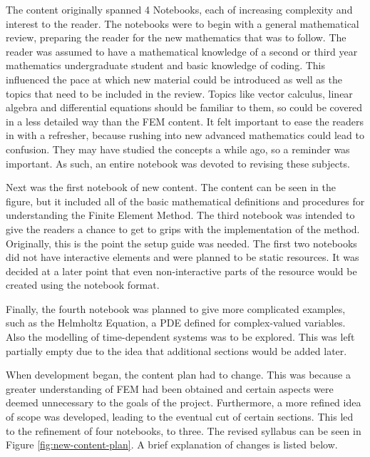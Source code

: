 The content originally spanned 4 Notebooks, each of increasing complexity and interest to the reader. The notebooks were to begin with a general mathematical review, preparing the reader for the new mathematics that was to follow. The reader was assumed to have a mathematical knowledge of a second or third year mathematics undergraduate student and basic knowledge of coding. This influenced the pace at which new material could be introduced as well as the topics that need to be included in the review. Topics like vector calculus, linear algebra and differential equations should be familiar to them, so could be covered in a less detailed way than the FEM content. It felt important to ease the readers in with a refresher, because rushing into new advanced mathematics could lead to confusion. They may have studied the concepts a while ago, so a reminder was important. As such, an entire notebook was devoted to revising these subjects.

Next was the first notebook of new content. The content can be seen in the figure, but it included all of the basic mathematical definitions and procedures for understanding the Finite Element Method. The third notebook was intended to give the readers a chance to get to grips with the implementation of the method. Originally, this is the point the setup guide was needed. The first two notebooks did not have interactive elements and were planned to be static resources. It was decided at a later point that even non-interactive parts of the resource would be created using the notebook format.

Finally, the fourth notebook was planned to give more complicated examples, such as the Helmholtz Equation, a PDE defined for complex-valued variables. Also the modelling of time-dependent systems was to be explored. This was left partially empty due to the idea that additional sections would be added later.

When development began, the content plan had to change. This was because a greater understanding of FEM had been obtained and certain aspects were deemed unnecessary to the goals of the project. Furthermore, a more refined idea of scope was developed, leading to the eventual cut of certain sections. This led to the refinement of four notebooks, to three. The revised syllabus can be seen in Figure \ref{fig:new-content-plan}. A brief explanation of changes is listed below.

